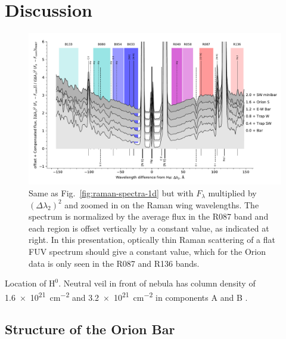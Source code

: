 \documentclass[times]{aastex63}
\newcommand*\chem[1]{\ensuremath{\mathrm{#1}}}
\begin{document}
\section{Discussion}
\label{sec:discussion}

\begin{figure}
  \centering
  \includegraphics[width=\linewidth]{figs/raman-muse-spectra-times-lambda-squared}
  \caption{Same as Fig.~\ref{fig:raman-spectra-1d} but with
    \(F_\lambda\) multiplied by \((\Delta\lambda_2)^2\) and zoomed in on the Raman wing
    wavelengths.  The spectrum is normalized by the average flux in
    the R087 band and each region is offset vertically by a constant
    value, as indicated at right.  In this presentation, optically
    thin Raman scattering of a flat FUV spectrum should give a
    constant value, which for the Orion data is only seen in the R087
    and R136 bands.}
  \label{fig:raman-compensated}
\end{figure}


Location of \chem{H^0}.  Neutral veil in front of nebula has column density of \SI{1.6e21}{cm^{-2}} and \SI{3.2e21}{cm^{-2}} in components A and B \citep{Abel:2006a}. 

\subsection{Structure of the Orion Bar}
\label{sec:structure-orion-bar}
\end{document}
